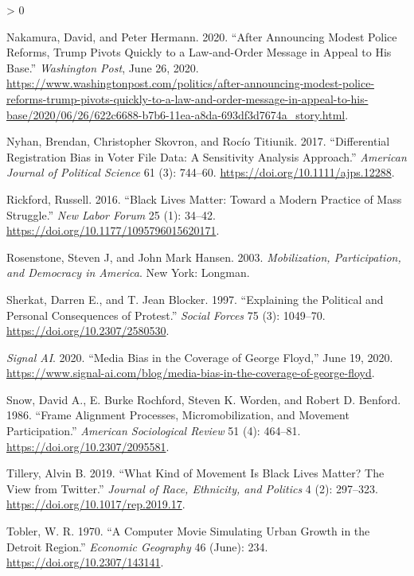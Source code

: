 \documentclass[
  12pt,
]{article}
\newlength{\cslhangindent}
\newenvironment{CSLReferences}[2] %
 {%
  \setlength{\parindent}{0pt}
  \ifodd #1 \everypar{\setlength{\hangindent}{\cslhangindent}}\ignorespaces\fi
  \ifnum #2 > 0
  \setlength{\parskip}{#2\baselineskip}
  \fi
 }%
 {}
\begin{document}
\begin{CSLReferences}{1}{0}
\leavevmode\hypertarget{ref-Nakamura2020}{}%
Nakamura, David, and Peter Hermann. 2020. {``After Announcing Modest Police Reforms, {Trump} Pivots Quickly to a Law-and-Order Message in Appeal to His Base.''} \emph{Washington Post}, June 26, 2020. \url{https://www.washingtonpost.com/politics/after-announcing-modest-police-reforms-trump-pivots-quickly-to-a-law-and-order-message-in-appeal-to-his-base/2020/06/26/622c6688-b7b6-11ea-a8da-693df3d7674a_story.html}.

\leavevmode\hypertarget{ref-Nyhan2017}{}%
Nyhan, Brendan, Christopher Skovron, and Rocío Titiunik. 2017. {``Differential {Registration Bias} in {Voter File Data}: {A Sensitivity Analysis Approach}.''} \emph{American Journal of Political Science} 61 (3): 744--60. \url{https://doi.org/10.1111/ajps.12288}.

\leavevmode\hypertarget{ref-Rickford2016}{}%
Rickford, Russell. 2016. {``Black {Lives Matter}: {Toward} a {Modern Practice} of {Mass Struggle}.''} \emph{New Labor Forum} 25 (1): 34--42. \url{https://doi.org/10.1177/1095796015620171}.

\leavevmode\hypertarget{ref-Rosenstone2003}{}%
Rosenstone, Steven J, and John Mark Hansen. 2003. \emph{Mobilization, Participation, and Democracy in {America}}. {New York}: {Longman}.

\leavevmode\hypertarget{ref-Sherkat1997}{}%
Sherkat, Darren E., and T. Jean Blocker. 1997. {``Explaining the {Political} and {Personal Consequences} of {Protest}.''} \emph{Social Forces} 75 (3): 1049--70. \url{https://doi.org/10.2307/2580530}.

\leavevmode\hypertarget{ref-SignalAI2020}{}%
\emph{Signal AI}. 2020. {``Media Bias in the Coverage of {George Floyd},''} June 19, 2020. \url{https://www.signal-ai.com/blog/media-bias-in-the-coverage-of-george-floyd}.

\leavevmode\hypertarget{ref-Snow1986}{}%
Snow, David A., E. Burke Rochford, Steven K. Worden, and Robert D. Benford. 1986. {``Frame {Alignment Processes}, {Micromobilization}, and {Movement Participation}.''} \emph{American Sociological Review} 51 (4): 464--81. \url{https://doi.org/10.2307/2095581}.

\leavevmode\hypertarget{ref-Tillery2019}{}%
Tillery, Alvin B. 2019. {``What {Kind} of {Movement} Is {Black Lives Matter}? {The View} from {Twitter}.''} \emph{Journal of Race, Ethnicity, and Politics} 4 (2): 297--323. \url{https://doi.org/10.1017/rep.2019.17}.

\leavevmode\hypertarget{ref-Tobler1970}{}%
Tobler, W. R. 1970. {``A {Computer Movie Simulating Urban Growth} in the {Detroit Region}.''} \emph{Economic Geography} 46 (June): 234. \url{https://doi.org/10.2307/143141}.


\end{CSLReferences}
\end{document}
